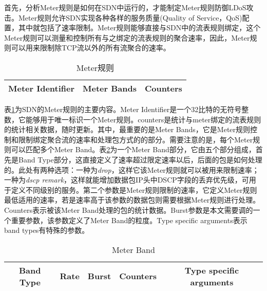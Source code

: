 首先，分析Meter规则是如何在SDN中运行的，才能制定Meter规则防御LDoS攻击。Meter规则允许SDN实现各种各样的服务质量(Quality of Service，QoS)配置，其中就包括了速率限制。Meter规则能够直接与SDN中的流表规则绑定，这个Meter规则可以测量和控制所有与之绑定的流表规则的聚合速率，因此，Meter规则可以用来限制除TCP流以外的所有流聚合的速率。

\begin{table}[htbp]
	\centering  %
	\caption{Meter规则}  %
	\label{table:meter}  %
	\begin{tabular}{|c|c|c|}  
		\hline  %
        Meter Identifier & Meter Bands& Counters \\  %
        \hline
		
	\end{tabular}
\end{table}

表\ref{table:meter}为SDN的Meter规则的主要内容。Meter Identifier是一个32比特的无符号整数，它能够用于唯一标识一个Meter规则。counters是统计与meter绑定的流表规则的统计相关数据，随时更新。其中，最重要的是Meter Bands，它是Meter规则控制和限制绑定聚合流的速率和处理包方式的的部分。需要注意的是，每个Meter规则可以匹配多个Meter Band。表\ref{table:meterbands}为一个Meter Band部分，它由五个部分组成，首先是Band Type部分，这直接定义了速率超过限定速率以后，后面的包是如何处理的。此处有两种选项：一种为\emph{drop}，这样它该Meter规则就可以被用来限制速率；一种为\emph{dscp remark}，这样就能增加数据包IP头中DSCP字段的丢弃优先级，可用于定义不同级别的服务。第二个参数是Meter规则限制的速率，它定义Meter规则最低适用的速率，若是速率高于该参数的数据包则需要根据Meter规则进行处理。Counters表示被该Meter Band处理的包的统计数据。Burst参数是本文需要调的一个重要参数，该参数定义了Meter Band的粒度。Type specific arguments表示band types有特殊的参数。

\begin{table}[htbp]
	\centering  %
	\caption{Meter Band}  %
	\label{table:meterbands}  %
	\begin{tabular}{|c|c|c|c|c|}  
		\hline  %
        Band Type & Rate & Burst & Counters & Type specific arguments \\  %
        \hline
		
	\end{tabular}
\end{table}


